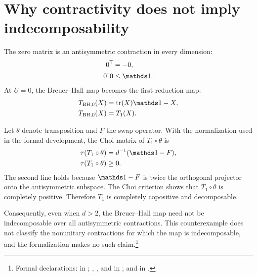 \documentclass{article}
\begin{document}
\section{Why contractivity does not imply indecomposability}

The zero matrix is an antisymmetric contraction in every dimension:
\begin{align}
    0^{\mathsf T}
        &=-0,
    \label{eq:wolf_breuer_hall_even_dim_restriction_zero_antisymmetric}\\
    0^\dagger0
        &\leq\Id.
    \label{eq:wolf_breuer_hall_even_dim_restriction_zero_contraction}
\end{align}
At $U=0$, the Breuer--Hall map becomes the first reduction map:
\begin{align}
    T_{\mathrm{BH},0}(X)
        &=\tr(X)\Id-X,
    \label{eq:wolf_breuer_hall_even_dim_restriction_zero_parameter_map}\\
    T_{\mathrm{BH},0}(X)
        &=T_1(X).
    \label{eq:wolf_breuer_hall_even_dim_restriction_reduction_map}
\end{align}

Let $\theta$ denote transposition and $F$ the swap operator. With the
normalization used in the formal development, the Choi matrix of
$T_1\circ\theta$ is
\begin{align}
    \tau(T_1\circ\theta)
        &=d^{-1}(\Id-F),
    \label{eq:wolf_breuer_hall_even_dim_restriction_reduction_choi}\\
    \tau(T_1\circ\theta)
        &\geq0.
    \label{eq:wolf_breuer_hall_even_dim_restriction_reduction_choi_positive}
\end{align}
The second line holds because $\Id-F$ is twice the orthogonal projector onto
the antisymmetric subspace. The Choi criterion shows that $T_1\circ\theta$ is
completely positive. Therefore $T_1$ is completely copositive and
decomposable.

Consequently, even when $d>2$, the Breuer--Hall map need not be
indecomposable over all antisymmetric contractions. This counterexample does
not classify the nonunitary contractions for which the map is
indecomposable, and the formalization makes no such claim.\footnote{Formal
declarations:
 in
;
,
, and
 in
; and
in .}
\end{document}

